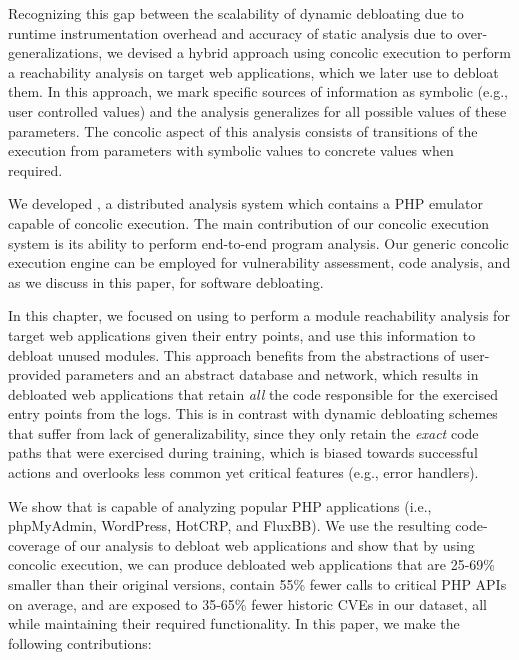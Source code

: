 Recognizing this gap between the scalability of dynamic debloating due to runtime instrumentation overhead and accuracy of static analysis due to over-generalizations, we devised a hybrid approach using concolic execution to perform a reachability analysis on target web applications, which we later use to debloat them. 
In this approach, we mark specific sources of information as symbolic (e.g., user controlled values) and the analysis generalizes for all possible values of these parameters. 
The concolic aspect of this analysis consists of transitions of the execution from parameters with symbolic values to concrete values when required. 

We developed \animatedead{}, a distributed analysis system which contains a PHP emulator capable of concolic execution. 
The main contribution of our concolic execution system is its ability to perform end-to-end program analysis. 
Our generic concolic execution engine can be employed for vulnerability assessment, code analysis, and as we discuss in this paper, for software debloating. 

In this chapter, we focused on using \animatedead{} to perform a module reachability analysis for target web applications given their entry points, and use this information to debloat unused modules. 
This approach benefits from the abstractions of user-provided parameters and an abstract database and network, which results in debloated web applications that retain \emph{all} the code responsible for the exercised entry points from the logs. 
This is in contrast with dynamic debloating schemes that suffer from lack of generalizability, since they only retain the \emph{exact} code paths that were exercised during training, which is biased towards successful actions and overlooks less common yet critical features (e.g., error handlers). 

We show that \animatedead{} is capable of analyzing popular PHP applications (i.e., phpMyAdmin, WordPress, HotCRP, and FluxBB). 
We use the resulting code-coverage of our analysis to debloat web applications and show that by using concolic execution, we can produce debloated web applications that are 25-69\% smaller than their original versions, contain 55\% fewer calls to critical PHP APIs on average, and are exposed to 35-65\% fewer historic CVEs in our dataset, all while maintaining their required functionality. 
In this paper, we make the following contributions:

